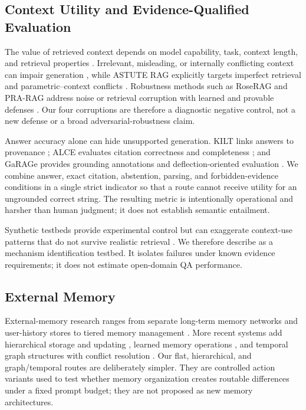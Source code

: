 

\subsection{Context Utility and Evidence-Qualified Evaluation}

The value of retrieved context depends on model capability, task, context length,
and retrieval properties \cite{LiEtAl2025LaRA}. Irrelevant, misleading, or
internally conflicting context can impair generation
\cite{OhThorne2023DetrimentalContexts,ParkLee2024RobustRALM}, while ASTUTE RAG
explicitly targets imperfect retrieval and parametric--context conflicts
\cite{WangEtAl2025AstuteRAG}. Robustness methods such as RoseRAG and PRA-RAG address
noise or retrieval corruption with learned and provable defenses
\cite{LiuEtAl2025RoseRAG,TanEtAl2026PRARAG}. Our four corruptions are therefore a
diagnostic negative control, not a new defense or a broad adversarial-robustness
claim.

Answer accuracy alone can hide unsupported generation. KILT links answers to
provenance \cite{PetroniEtAl2021KILT}; ALCE evaluates citation correctness and
completeness \cite{GaoEtAl2023ALCE}; and GaRAGe provides grounding annotations and
deflection-oriented evaluation \cite{SorodocEtAl2025GaRAGe}. We combine answer,
exact citation, abstention, parsing, and forbidden-evidence conditions in a single
strict indicator so that a route cannot receive utility for an ungrounded correct
string. The resulting metric is intentionally operational and harsher than human
judgment; it does not establish semantic entailment.

Synthetic testbeds provide experimental control but can exaggerate context-use
patterns that do not survive realistic retrieval
\cite{HagstromEtAl2025RealityCheck}. We therefore describe \bench{} as a mechanism
identification testbed. It isolates failures under known evidence requirements; it
does not estimate open-domain QA performance.

\subsection{External Memory}

External-memory research ranges from separate long-term memory networks
\cite{WangEtAl2023LongMem} and user-history stores \cite{ZhongEtAl2024MemoryBank}
to tiered memory management \cite{PackerEtAl2023MemGPT}. More recent systems add
hierarchical storage and updating \cite{KangEtAl2025MemoryOS}, learned memory
operations \cite{YanEtAl2026MemoryR1}, and temporal graph structures with conflict
resolution \cite{BanerjeeEtAl2026APEXMEM}. Our flat, hierarchical, and graph/temporal
routes are deliberately simpler. They are controlled action variants used to test
whether memory organization creates routable differences under a fixed prompt
budget; they are not proposed as new memory architectures.

